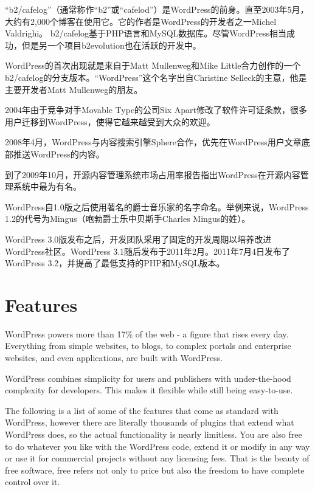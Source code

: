 “b2/cafelog”（通常称作“b2”或“cafelod”）是WordPress的前身。直至2003年5月，大约有2,000个博客在使用它。它的作者是WordPress的开发者之一Michel Valdrighi。 b2/cafelog基于PHP语言和MySQL数据库。尽管WordPress相当成功，但是另一个项目b2evolution也在活跃的开发中。

WordPress的首次出现就是来自于Matt Mullenweg和Mike Little合力创作的一个b2/cafelog的分支版本。“WordPress”这个名字出自Christine Selleck的主意，他是主要开发者Matt Mullenweg的朋友。

2004年由于竞争对手Movable Type的公司Six Apart修改了软件许可证条款，很多用户迁移到WordPress，使得它越来越受到大众的欢迎。

2008年4月，WordPress与内容搜索引擎Sphere合作，优先在WordPress用户文章底部推送WordPress的内容。

到了2009年10月，开源内容管理系统市场占用率报告指出WordPress在开源内容管理系统中最为有名。

WordPress自1.0版之后使用著名的爵士音乐家的名字命名。举例来说，WordPress 1.2的代号为Mingus（咆勃爵士乐中贝斯手Charles Mingus的姓）。

WordPress 3.0版发布之后，开发团队采用了固定的开发周期以培养改进WordPress社区。WordPress 3.1随后发布于2011年2月。2011年7月4日发布了WordPress 3.2，并提高了最低支持的PHP和MySQL版本。



\chapter{Features}

WordPress powers more than 17\% of the web - a figure that rises every day. Everything from simple websites, to blogs, to complex portals and enterprise websites, and even applications, are built with WordPress\cite{wp_features}.

WordPress combines simplicity for users and publishers with under-the-hood complexity for developers. This makes it flexible while still being easy-to-use.

The following is a list of some of the features that come as standard with WordPress, however there are literally thousands of plugins that extend what WordPress does, so the actual functionality is nearly limitless. You are also free to do whatever you like with the WordPress code, extend it or modify in any way or use it for commercial projects without any licensing fees. That is the beauty of free software, free refers not only to price but also the freedom to have complete control over it.

